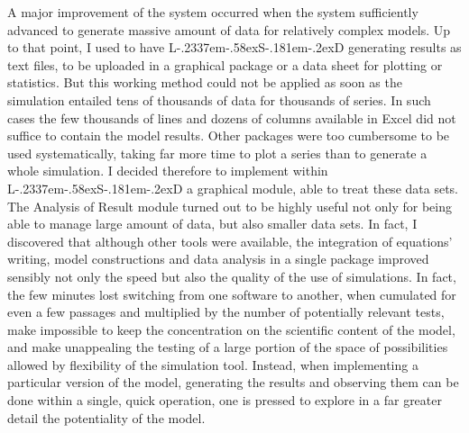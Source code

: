 \documentclass [11pt,a4paper] {book}
\def\LsD{{L\kern-.2337em\lower-.58ex\hbox{S}\kern-.181em\lower-.2ex\hbox{D}}\xspace}
\begin{document}
A major improvement of the system occurred when the system sufficiently advanced to generate massive amount of data for relatively complex models. Up to that point, I used to have \LsD generating results as text files, to be uploaded in a graphical package or a data sheet for plotting or statistics. But this working method could not be applied as soon as the simulation entailed tens of thousands of data for thousands of series. In such cases the few thousands of lines and dozens of columns available in Excel did not suffice to contain the model results. Other packages were too cumbersome to be used systematically, taking far more time to plot a series than to generate a whole simulation. I decided therefore to implement within \LsD a graphical module, able to treat these data sets. The Analysis of Result module turned out to be highly useful not only for being able to manage large amount of data, but also smaller data sets. In fact, I discovered that although other tools were available, the integration of equations' writing, model constructions and data analysis in a single package improved sensibly not only the speed but also the quality of the use of simulations. In fact, the few minutes lost switching from one software to another, when cumulated for even a few passages and multiplied by the number of potentially relevant tests, make impossible to keep the concentration on the scientific content of the model, and make unappealing the testing of a large portion of the space of possibilities allowed by flexibility of the simulation tool. Instead, when implementing a particular version of the model, generating the results and observing them can be done within a single, quick operation, one is pressed to explore in a far greater detail the potentiality of the model.
\end{document}
